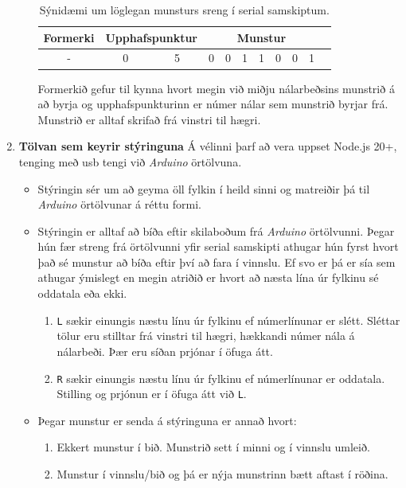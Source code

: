 \begin{enumerate}
\begin{itemize}
        \begin{table}[H]
            \centering
	\begin{tabular}{|c|c|c|c|c|c|c|c|c|c|c|}
		\hline
		\multicolumn{1}{|c|}{\textbf{Formerki}} & \multicolumn{2}{c|}{\textbf{Upphafspunktur}} & \multicolumn{7}{c|}{\textbf{Munstur}} \\ 
		\hline
		- & 0 & 5 & 0 & 0 & 1 & 1 & 0 & 0 & 1 \\ 
		\hline
		\end{tabular}
            \caption{Sýnidæmi um löglegan munsturs sreng í serial samskiptum.}
            \label{tab:MunsturStrengur}
        \end{table}
        Formerkið gefur til kynna hvort megin við miðju nálarbeðsins munstrið á að byrja og upphafspunkturinn er númer nálar sem munstrið byrjar frá. Munstrið er alltaf skrifað frá vinstri til hægri.
    \end{itemize}
    \item \textbf{Tölvan sem keyrir stýringuna}
    Á vélinni þarf að vera uppset Node.js 20+, tenging með usb tengi við \textit{Arduino} örtölvuna.
    \begin{itemize}
        \item Stýringin sér um að geyma öll fylkin í heild sinni og matreiðir þá til \textit{Arduino} örtölvunar á réttu formi.
        \item Stýringin er alltaf að bíða eftir skilaboðum frá \textit{Arduino} örtölvunni. Þegar hún fær streng frá örtölvunni yfir serial samskipti athugar hún fyrst hvort það sé munstur að bíða eftir því að fara í vinnslu. Ef svo er þá er sía sem athugar ýmislegt en megin atriðið er hvort að næsta lína úr fylkinu sé oddatala eða ekki. \begin{enumerate}
            \item \texttt{L} sækir einungis næstu línu úr fylkinu ef númerlínunar er slétt. Sléttar tölur eru stilltar frá vinstri til hægri, hækkandi númer nála á nálarbeði. Þær eru síðan prjónar í öfuga átt.
            \item \texttt{R} sækir einungis næstu línu úr fylkinu ef númerlínunar er oddatala. Stilling og prjónun er í öfuga átt við \texttt{L}.
        \end{enumerate}
        \item Þegar munstur er senda á stýringuna er annað hvort:
        \begin{enumerate}
            \item Ekkert munstur í bið. Munstrið sett í minni og í vinnslu umleið.
            \item Munstur í vinnslu/bið og þá er nýja munstrinn bætt aftast í röðina.

\end{enumerate}
\end{itemize}
\end{enumerate}
